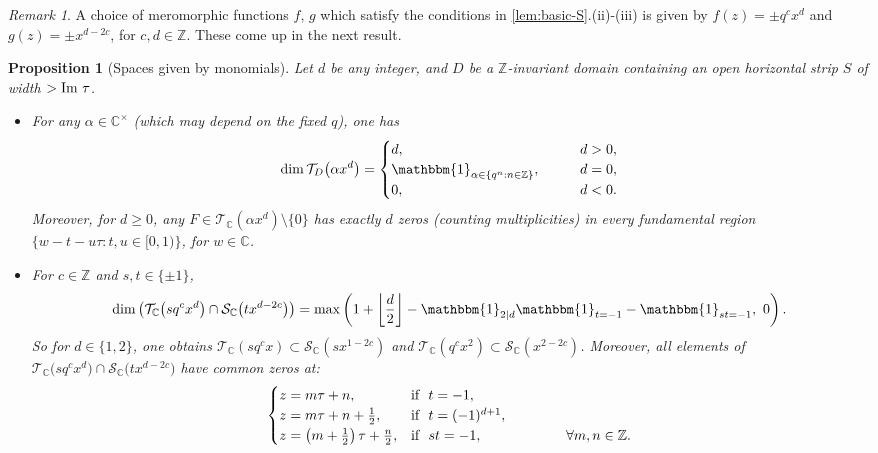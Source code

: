 \documentclass[reqno,11pt]{amsart}
\newtheorem{proposition}[theorem]{Proposition}
\theoremstyle{definition}
\theoremstyle{remark}
\newtheorem*{remark}{Remark}
\numberwithin{equation}{section}
\newcommand{\Z}{\mathbb{Z}}
\newcommand{\C}{\mathbb{C}}
\newcommand{\mT}{\mathcal{T}}
\newcommand{\mS}{\mathcal{S}}
\newcommand{\one}{\mathbbm{1}}
\renewcommand{\Im}{\textnormal{Im}\ }
\begin{document}
\begin{remark}
A choice of meromorphic functions $f$, $g$ which satisfy the conditions in \cref{lem:basic-S}.(ii)-(iii) is given by $f(z) = \pm q^{c} x^d$ and $g(z) = \pm x^{d-2c}$, for $c, d \in \Z$. These come up in the next result.
\end{remark}


\begin{proposition}[Spaces given by monomials] \label{prop:monomial-spaces}
Let $d$ be any integer, and $D$ be a $\Z$-invariant domain containing an open horizontal strip $S$ of width $> \Im \tau$.
\begin{itemize}
\item[(i)] For any $\alpha \in \C^\times$ (which may depend on the fixed $q$), one has
\[
    \dim \mT_D\big(\alpha x^d\big) = 
    \begin{cases} 
    d, \qquad &d > 0, \\
    \one_{\alpha \in \left\{q^n : n \in \Z \right\}}, \qquad &d = 0, \\
    0, \qquad &d < 0.
    \end{cases}
\]
Moreover, for $d \ge 0$, any $F \in \mT_\C\left(\alpha x^d\right) \setminus \{0\}$ has exactly $d$ zeros (counting multiplicities) in every fundamental region $\{w - t - u\tau : t, u \in [0, 1) \}$, for $w \in \C$. 
\item[(ii)] For $c \in \Z$ and $s, t \in \{\pm 1\}$,
\begin{equation} \label{eq:dimension}
    \dim \left( \mT_\C \big(sq^c x^d \big) \cap \mS_\C \big(tx^{d-2c}\big) \right) = 
    \max\left( 1 + \left\lfloor \frac{d}{2} \right\rfloor 
    -
    \one_{2 \mid d} \one_{t = -1}
    -
    \one_{st = -1} ,\ 0\right).
\end{equation}
So for $d \in \{1, 2\}$, one obtains $\mT_\C\left(s q^cx\right) \subset \mS_\C\left(s x^{1-2c}\right)$ and $\mT_\C\left(q^cx^2\right) \subset \mS_\C\left(x^{2-2c}\right)$. Moreover, all elements of $\mT_\C \big(sq^c x^d \big) \cap \mS_\C \big(tx^{d-2c}\big)$ have common zeros at:
\[
\begin{cases}
z = m\tau + n, &\textnormal{if }\ t = -1, \\
z = m\tau + n + \frac{1}{2}, &\textnormal{if }\ t = (-1)^{d+1}, 
\\
z = \left(m + \frac{1}{2}\right)\tau + \frac{n}{2}, &\textnormal{if }\ st = -1,
\qquad\qquad\qquad \forall m,n \in \Z.
\end{cases}
\]

\end{itemize}
\end{proposition}
\end{document}

